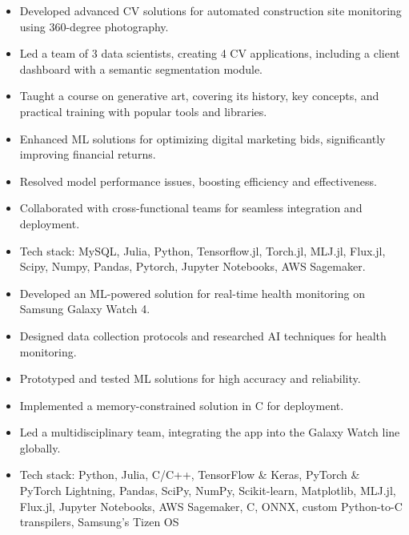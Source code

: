 \documentclass[10pt,a4paper]{altacv}
\begin{document}
{\divider

\begin{itemize}
\item Developed advanced CV solutions for automated construction site monitoring using 360-degree photography.
\item Led a team of 3 data scientists, creating 4 CV applications, including a client dashboard with a semantic segmentation module.
\end{itemize}

\divider

\begin{itemize}
\item Taught a course on generative art, covering its history, key concepts, and practical training with popular tools and libraries.
\end{itemize}

\divider

\begin{itemize}
\item Enhanced ML solutions for optimizing digital marketing bids, significantly improving financial returns.
\item Resolved model performance issues, boosting efficiency and effectiveness.
\item Collaborated with cross-functional teams for seamless integration and deployment.
\item Tech stack: MySQL, Julia, Python, Tensorflow.jl, Torch.jl, MLJ.jl, Flux.jl, Scipy, Numpy, Pandas, Pytorch, Jupyter Notebooks, AWS Sagemaker.
\end{itemize}

\divider

\begin{itemize}
\item Developed an ML-powered solution for real-time health monitoring on Samsung Galaxy Watch 4.
\item Designed data collection protocols and researched AI techniques for health monitoring.
\item Prototyped and tested ML solutions for high accuracy and reliability.
\item Implemented a memory-constrained solution in C for deployment.
\item Led a multidisciplinary team, integrating the app into the Galaxy Watch line globally.
\item Tech stack: Python, Julia, C/C++, TensorFlow \& Keras, PyTorch \& PyTorch Lightning, Pandas, SciPy, NumPy, Scikit-learn, Matplotlib, MLJ.jl, Flux.jl, Jupyter Notebooks, AWS Sagemaker, C, ONNX, custom Python-to-C transpilers, Samsung's Tizen OS
\end{itemize}

}
\end{document}
